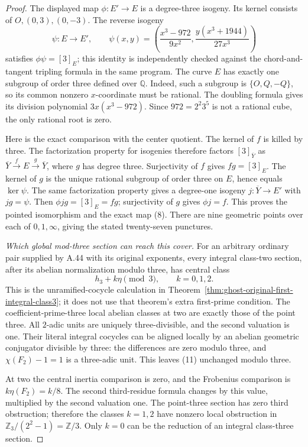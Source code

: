 \begin{proof}
The displayed map \(\phi:E'\to E\) is a
degree-three isogeny. Its kernel consists of
\(O,(0,3),(0,-3)\). The reverse isogeny
\[
 \psi:E\longrightarrow E',\qquad
 \psi(x,y)=
 \left(\frac{x^3-972}{9x^2},
       \frac{y(x^3+1944)}{27x^3}\right)
\]
satisfies \(\phi\psi=[3]_E\); this identity
is independently checked against the chord-and-tangent
tripling formula in the same program.
The curve \(E\) has exactly one subgroup of order
three defined over \(\mathbb Q\). Indeed, such a
subgroup is \(\{O,Q,-Q\}\), so its common
nonzero \(x\)-coordinate must be rational.
The doubling formula gives its division polynomial
\(3x(x^3-972)\). Since \(972=2^2 3^5\) is
not a rational cube, the only rational root is zero.

Here is the exact comparison with the center quotient.
The kernel of \(f\) is killed by three. The
factorization property for isogenies
\cite[II.1.7--1.8]{GhostMilneEC} therefore factors
\([3]_{\overline Y}\) as
\(\overline Y\xrightarrow f E\xrightarrow g\overline Y\),
where \(g\) has degree three. Surjectivity of
\(f\) gives \(fg=[3]_E\). The kernel of \(g\)
is the unique rational subgroup of order three on
\(E\), hence equals \(\ker\psi\). The same
factorization property gives a degree-one isogeny
\(j:\overline Y\to E'\) with \(jg=\psi\).
Then \(\phi jg=[3]_E=fg\); surjectivity of
\(g\) gives \(\phi j=f\). This proves the
pointed isomorphism and the exact map (8).
There are nine geometric points over each of
\(0,1,\infty\), giving the stated twenty-seven
punctures.

\emph{Which global mod-three section can reach this cover.}
For an arbitrary ordinary pair supplied by A.44
with its original exponents, every integral class-two
section, after its abelian normalization modulo
three, has central class
\[
                       h_3+k\eta\pmod3,
                         \qquad k=0,1,2.             \tag{11}
\]
This is the unramified-cocycle calculation in
Theorem~\ref{thm:ghost-original-first-integral-class3};
it does not use that theorem's extra first-prime
condition. The coefficient-prime-three local
abelian classes at two are exactly those of the
point three. All \(2\)-adic units are uniquely
three-divisible, and the second valuation is one.
Their literal integral cocycles can be aligned
locally by an abelian geometric conjugator divisible
by three: the differences are zero modulo three,
and \(\chi(F_2)-1=1\) is a three-adic unit.
This leaves (11) unchanged modulo three.

At two the central inertia comparison is zero,
and the Frobenius comparison is
\(k\eta(F_2)=k/8\). The second third-residue
formula changes by this value, multiplied by the
second valuation one. The point-three section has
zero third obstruction; therefore the classes
\(k=1,2\) have nonzero local obstruction in
\(\mathbb Z_3/(2^2-1)=\mathbb Z/3\).
Only \(k=0\) can be the reduction of an integral
class-three section.


\end{proof}
